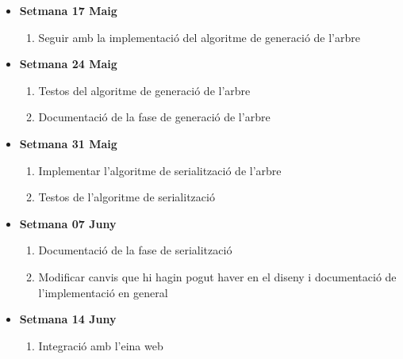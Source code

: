 \documentclass{article}
\begin{document}
\begin{itemize}
\begin{enumerate}
		\end{enumerate}
		\item \textbf{Setmana 17 Maig}
		\begin{enumerate}
			\item Seguir amb la implementació  del  algoritme de generació de l'arbre
		\end{enumerate}
		\item \textbf{Setmana 24 Maig}
		\begin{enumerate}
			\item Testos del algoritme de generació de l'arbre
			\item Documentació de la fase de generació de l'arbre
		\end{enumerate}
		\item \textbf{Setmana 31 Maig}
		\begin{enumerate}
			\item Implementar l'algoritme de serialització de l'arbre
			\item Testos de l'algoritme de serialització
		\end{enumerate}
		\item \textbf{Setmana 07 Juny}
		\begin{enumerate}
			\item Documentació de la fase de serialització
			\item Modificar canvis que hi hagin pogut haver en el diseny i documentació de l'implementació en general
		\end{enumerate}
		\item \textbf{Setmana 14 Juny}
		\begin{enumerate}
			\item Integració amb l'eina web
		\end{enumerate}
	\end{itemize}
\end{document}
